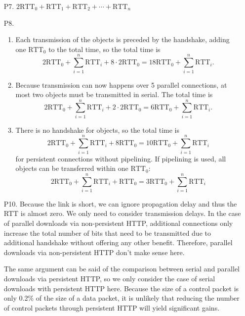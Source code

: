 \documentclass{article}
\begin{document}
\begin{enumerate}
    \item[P7.] $2\mathrm{RTT}_0 + \mathrm{RTT}_1 + \mathrm{RTT}_2 + \cdots + \mathrm{RTT}_n$

    \item[P8.] \begin{enumerate}
        \item Each transmission of the objects is preceded by the handshake, adding one $\mathrm{RTT}_0$ to the total time, so the total time is
        \[
            2\mathrm{RTT}_0 + \sum_{i = 1}^n \mathrm{RTT}_i + 8 \cdot 2\mathrm{RTT}_0 = 18\mathrm{RTT}_0 + \sum_{i = 1}^n \mathrm{RTT}_i.
        \]
        \item Because transmission can now happens over 5 parallel connections, at most two objects must be transmitted in serial. The total time is
        \[
            2\mathrm{RTT}_0 + \sum_{i = 1}^n \mathrm{RTT}_i + 2 \cdot 2\mathrm{RTT}_0 = 6\mathrm{RTT}_0 + \sum_{i = 1}^n \mathrm{RTT}_i.
        \]
        \item There is no handshake for objects, so the total time is
        \[
            2\mathrm{RTT}_0 + \sum_{i = 1}^n \mathrm{RTT}_i + 8\mathrm{RTT}_0 = 10\mathrm{RTT}_0 + \sum_{i = 1}^n \mathrm{RTT}_i
        \]
        for persistent connections without pipelining. If pipelining is used, all objects can be transferred within one $\mathrm{RTT}_0$:
        \[
            2\mathrm{RTT}_0 + \sum_{i = 1}^n \mathrm{RTT}_i + \mathrm{RTT}_0 = 3\mathrm{RTT}_0 + \sum_{i = 1}^n \mathrm{RTT}_i
        \]
    \end{enumerate}

    \item[P10.] Because the link is short, we can ignore propagation delay and thus the RTT is almost zero. We only need to consider transmission delays. In the case of parallel downloads via non-persistent HTTP, additional connections only increase the total number of bits that need to be transmitted due to additional handshake without offering any other benefit. Therefore, parallel downloads via non-persistent HTTP don't make sense here.

    The same argument can be said of the comparison between serial and parallel downloads via persistent HTTP, so we only consider the case of serial downloads with persistent HTTP here. Because the size of a control packet is only 0.2\% of the size of a data packet, it is unlikely that reducing the number of control packets through persistent HTTP will yield significant gains.
\end{enumerate}
\end{document}
